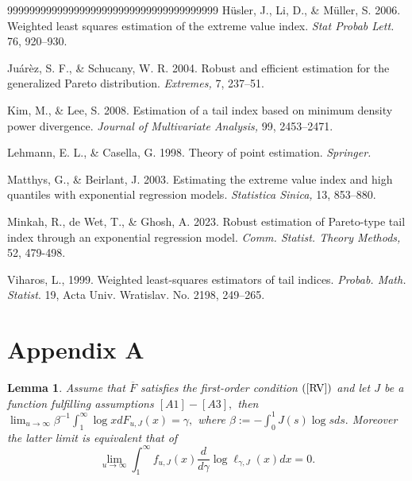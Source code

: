 \documentclass[12pt,reqno,openbib,runningheads,a4paper,portrait]{amsart}%
\newtheorem{lemma}{Lemma}[section]
\begin{document}
\begin{thebibliography}{99999999999999999999999999999999999999}
H\"{u}sler, J., Li, D., \&
M\"{u}ller, S. 2006. Weighted least squares estimation of the extreme value
index. \textit{Stat Probab Lett.} 76, 920--930.

Ju\'{a}r\`{e}z, S. F., \&
Schucany, W. R. 2004. Robust and efficient estimation for the generalized
Pareto distribution. \textit{Extremes,} 7, 237--51.

Kim, M., \& Lee, S. 2008. Estimation of a
tail index based on minimum density power divergence. \textit{Journal of
Multivariate Analysis,} 99, 2453--2471.

Lehmann, E. L., \& Casella, G. 1998.
Theory of point estimation. \textit{Springer.}

Matthys, G., \& Beirlant, J. 2003.
Estimating the extreme value index and high quantiles with exponential
regression models. \textit{Statistica Sinica,} 13, 853--880.

Minkah, R., de Wet, T., \&
Ghosh, A. 2023. Robust estimation of Pareto-type tail index through an
exponential regression model. \textit{Comm. Statist. Theory Methods,} 52, 479-498.

Viharos, L., 1999. Weighted least-squares
estimators of tail indices. \textit{Probab. Math. Statist}. 19, Acta Univ.
Wratislav. No. 2198, 249--265.
\end{thebibliography}

\section{\textbf{Appendix A\label{sec7}}}

\begin{lemma}
\textbf{\label{lemma1}}Assume that $\overline{F}$ satisfies the first-order
condition $\left(  \ref{RV}\right)  $ and let $J$ be a function fulfilling
assumptions $\left[  A1\right]  -\left[  A3\right]  ,$ then $\lim
_{u\rightarrow\infty}\beta^{-1}\int_{1}^{\infty}\log xdF_{u,J}\left(
x\right)  =\gamma,$ where $\beta:=-\int_{0}^{1}J\left(  s\right)  \log sds.$
Moreover the latter limit is equivalent that of
\[
\lim_{u\rightarrow\infty}\int_{1}^{\infty}f_{u,J}\left(  x\right)  \dfrac
{d}{d\gamma}\log\ell_{\gamma,J}\left(  x\right)  dx=0.
\]

\end{lemma}
\end{document}
